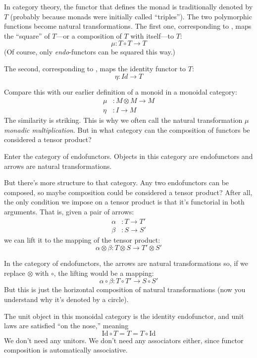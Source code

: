 \documentclass[DaoFP]{subfiles}
\begin{document}
In category theory, the functor that defines the monad is traditionally denoted by $T$ (probably because monads were initially called ``triples''). The two polymorphic functions become natural transformations. The first one, corresponding to , maps the ``square'' of $T$---or a composition of $T$ with itself---to $T$:
\[ \mu \colon T \circ T \to T \]
(Of course, only \emph{endo}-functors can be squared this way.) 

The second, corresponding to , maps the identity functor to $T$:
\[ \eta \colon Id \to T \]

Compare this with our earlier definition of a monoid in a monoidal category:
\begin{align*}
\mu &\colon M \otimes M \to M \\
\eta &\colon I \to M
\end{align*}
The similarity is striking. This is why we often call the natural transformation $\mu$ \emph{monadic multiplication}. But in what category can the composition of functors be considered a tensor product? 

Enter the category of endofunctors. Objects in this category are endofunctors and arrows are natural transformations. 

But there's more structure to that category. Any two endofunctors can be composed, so maybe composition could be considered a tensor product? After all, the only condition we impose on a tensor product is that it's functorial in both arguments. That is, given a pair of arrows:
\begin{align*}
 \alpha &\colon T \to T' \\
 \beta &\colon S \to S' 
\end{align*}
 we can lift it to the mapping of the tensor product:
 \[ \alpha \otimes \beta \colon T \otimes S \to T' \otimes S' \]
 
 In the category of endofunctors, the arrows are natural transformations so, if we replace $\otimes$ with $\circ$, the lifting would be a mapping:
\[ \alpha \circ \beta \colon T \circ T' \to S \circ S' \]
But this is just the horizontal composition of natural transformations (now you understand why it's denoted by a circle).

The unit object in this monoidal category is the identity endofunctor, and unit laws are satisfied ``on the nose,'' meaning
\[ \text{Id} \circ T = T = T \circ \text{Id}\]
We don't need any unitors. We don't need any associators either, since functor composition is automatically associative. 
\end{document}
